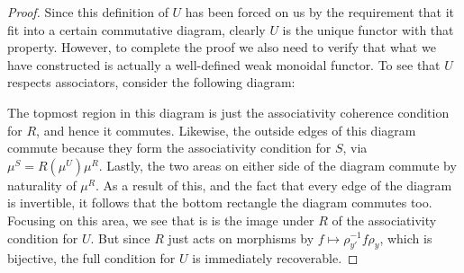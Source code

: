 \documentclass{amsart} %
\newenvironment{eq*}{\begin{equation*}}{\end{equation*}}
\begin{document}
\begin{proof}
Since this definition of $U$ has been forced on us by the requirement that it fit into a certain commutative diagram, clearly $U$ is the unique functor with that property. However, to complete the proof we also need to verify that what we have constructed is actually a well-defined weak monoidal functor. To see that $U$ respects associators, consider the following diagram:
\begin{eq*} 
\end{eq*}
The topmost region in this diagram is just the associativity coherence condition for $R$, and hence it commutes. Likewise, the outside edges of this diagram commute because they form the associativity condition for $S$, via $\mu^S = R(\mu^U) \mu^R$. Lastly, the two areas on either side of the diagram commute by naturality of $\mu^R$. As a result of this, and the fact that every edge of the diagram is invertible, it follows that the bottom rectangle the diagram commutes too. Focusing on this area, we see that is is the image under $R$ of the associativity condition for $U$. But since $R$ just acts on morphisms by $f \mapsto \rho_{y'}^{-1} f \rho_y$, which is bijective, the full condition for $U$ is immediately recoverable. 


\end{proof}
\end{document}
